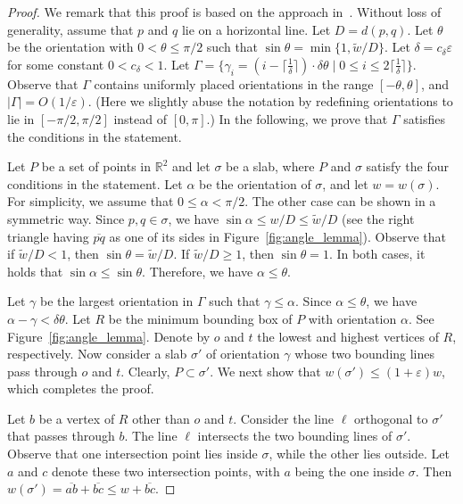 \documentclass[english,a4paper, cleveref, autoref, thm-restate, nolineno]{socg-lipics-v2021}
\theoremstyle{star}
\theoremstyle{claimstar}
\newcommand{\eps}{\ensuremath{\varepsilon}}
\begin{document}
\begin{proof}
    We remark that this proof is based on the approach in~\cite{agarwalTwo}.
    Without loss of generality, assume that $p$ and $q$ lie on a horizontal line. 
    Let $D = d(p, q)$. 
    Let $\theta$ be the orientation with $0< \theta \le \pi/2$ such that $\sin\theta = \min \{1, \widetilde w/{D} \}$.
    Let $\delta =  c_\delta \eps$ for some constant $0 < c_\delta < 1$. 
    Let $\Gamma = \{\gamma_i = (i- \lceil \frac{1}{\delta}\rceil)\cdot \delta\theta  \mid 0 \le i \le 2\lceil \frac{1}{\delta}\rceil \}$.
    Observe that $\Gamma$ contains uniformly placed orientations in the range $[-\theta, \theta]$, and $|\Gamma| = O(1/\eps)$. (Here we slightly abuse the notation by redefining orientations to lie in $[-\pi/2, \pi/2]$ instead of $[0, \pi]$.)
    In the following, we prove that $\Gamma$ satisfies the conditions in the statement.

    Let $P$ be a set of points in $\mathbb{R}^2$ and let $\sigma$ be a slab, where $P$ and $\sigma$ satisfy the four conditions in the statement.
    Let $\alpha$ be the orientation of $\sigma$, and let $w = w(\sigma)$. 
    For simplicity, we assume that $0\le \alpha < \pi/2$. The other case can be shown in a symmetric way. 
    Since $p, q \in \sigma$, we have $\sin \alpha \le w/D \le \widetilde w/D$ (see the right triangle having $\overline{pq}$ as one of its sides in Figure~\ref{fig:angle_lemma}).
    Observe that if $\widetilde w/ D < 1$, then $\sin \theta = \widetilde w/ D$. If $\widetilde w/ D \ge 1$, then $\sin \theta =1$. In both cases, it holds that $\sin \alpha \le \sin \theta$. Therefore, we have $\alpha \le \theta$. 


     Let $\gamma$ be the largest orientation in $\Gamma$ such that $\gamma \le \alpha$. 
     Since $ \alpha \le  \theta$, we have $\alpha - \gamma < \delta \theta$. 
     Let $R$ be the minimum bounding box of $P$ with orientation $\alpha$. See Figure~\ref{fig:angle_lemma}.
     Denote by $o$ and $t$ the lowest and highest vertices of $R$, respectively. 
    Now consider a slab $\sigma'$ of orientation $\gamma$ whose two bounding lines pass through $o$ and $t$. 
    Clearly, $P \subset \sigma'$. 
    We next show that $w(\sigma') \le (1+\eps)w$, which completes the proof.

    Let $b$ be a vertex of $R$ other than $o$ and $t$. 
    Consider the line $\ell$ orthogonal to $\sigma'$ that passes through $b$. 
    The line $\ell$ intersects the two bounding lines of $\sigma'$. 
    Observe that one intersection point lies inside $\sigma$, while the other lies outside. 
    Let $a$ and $c$ denote these two intersection points, with $a$ being the one inside $\sigma$. 
    Then $w(\sigma') = \overline{ab} + \overline{bc} \le w + \overline{bc}$.


\end{proof}
\end{document}

